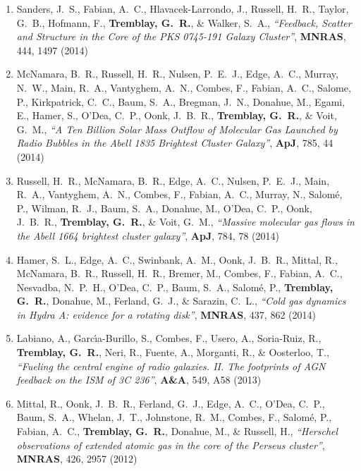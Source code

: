 \documentclass[11pt]{article}
\begin{document}
\begin{enumerate}[resume]
\item Sanders, J.~S., Fabian, A.~C., Hlavacek-Larrondo, J., Russell, H.~R., Taylor, G.~B., Hofmann, F., \textbf{Tremblay, G.~R.}, \& Walker, S.~A.,  \textit{``Feedback, Scatter and Structure in the Core of the PKS 0745-191 Galaxy Cluster''}, \textbf{MNRAS}, 444, 1497 (2014)


\item McNamara, B.~R., Russell, H.~R., Nulsen, P.~E.~J., Edge, A.~C., Murray,
N.~W., Main, R.~A., Vantyghem, A.~N., Combes, F., Fabian, A.~C., Salome,
P., Kirkpatrick, C.~C., Baum, S.~A., Bregman, J.~N., Donahue, M., Egami,
E., Hamer, S., O'Dea, C.~P., Oonk, J.~B.~R., \textbf{Tremblay, G.~R.},
\& Voit, G.~M., \textit{``A Ten Billion Solar Mass Outflow of Molecular Gas Launched by Radio Bubbles in the Abell 1835 Brightest Cluster Galaxy''}, \textbf{ApJ}, 785, 44 (2014)


\item Russell, H.~R., McNamara, B.~R., Edge, A.~C., Nulsen, P.~E.~J., Main,
R.~A., Vantyghem, A.~N., Combes, F., Fabian, A.~C., Murray, N., Salom\'{e}, P.,
Wilman, R.~J., Baum, S.~A., Donahue, M., O'Dea, C.~P., Oonk, J.~B.~R.,
\textbf{Tremblay, G.~R.},
\& Voit, G.~M.,  \textit{``Massive molecular gas flows in the Abell 1664 brightest cluster galaxy''}, \textbf{ApJ}, 784, 78 (2014)



\item Hamer, S.~L., Edge, A.~C., Swinbank, A.~M., Oonk, J.~B.~R., Mittal, R., McNamara, B.~R., Russell, H.~R., Bremer, M., Combes, F., Fabian, A.~C., Nesvadba, N.~P.~H., O'Dea, C.~P., Baum, S.~A., Salom\'{e}, P., \textbf{Tremblay, G.~R.}, Donahue, M., Ferland, G.~J., \& Sarazin, C.~L.,  \textit{``Cold gas dynamics in Hydra A: evidence for a rotating disk''}, \textbf{MNRAS}, 437, 862 (2014)




\item Labiano, A., Garc{\'{\i}}a-Burillo, S., Combes, F., Usero, A.,
Soria-Ruiz, R., \textbf{Tremblay, G.~R.}, Neri, R., Fuente, A., Morganti, R.,
\& Oosterloo, T.,  \textit{``Fueling the central engine of radio galaxies. II. The footprints of AGN feedback on the ISM of 3C 236''}, \textbf{A\&A}, 549,  A58 (2013)


\item Mittal, R., Oonk, J.~B.~R., Ferland, G.~J., Edge, A.~C., O'Dea, C.~P.,
Baum, S.~A., Whelan, J.~T., Johnstone, R.~M., Combes, F., Salom{\'e}, P.,
Fabian, A.~C., \textbf{Tremblay, G.~R.}, Donahue, M.,
\& Russell, H., \textit{``Herschel observations of extended atomic gas in the core of the Perseus cluster''}, \textbf{MNRAS}, 426,  2957 (2012)





\end{enumerate}
\end{document}
